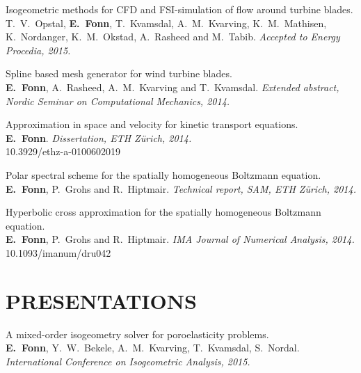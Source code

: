 \documentclass[line,margin]{res}
\newcommand{\zh}{Z\"{u}rich}
\begin{document}
\begin{resume}
Isogeometric methods for CFD and FSI-simulation of flow around turbine blades. \\
T.~V.~Opstal, {\bf E.~Fonn}, T.~Kvamsdal, A.~M.~Kvarving, K.~M.~Mathisen,
K.~Nordanger, K.~M.~Okstad, A.~Rasheed and M.~Tabib.
{\em Accepted to Energy Procedia, 2015.}




Spline based mesh generator for wind turbine blades. \\
{\bf E.~Fonn}, A.~Rasheed, A.~M.~Kvarving and T.~Kvamsdal.
{\em Extended abstract,  Nordic Seminar on Computational Mechanics, 2014.}

Approximation in space and velocity for kinetic transport equations. \\
{\bf E.~Fonn}.
{\em Dissertation, ETH \zh, 2014.} \\
10.3929/ethz-a-0100602019

Polar spectral scheme for the spatially homogeneous Boltzmann equation. \\
{\bf E.~Fonn}, P.~Grohs and R.~Hiptmair.
{\em Technical report, SAM, ETH \zh, 2014.}

Hyperbolic cross approximation for the spatially homogeneous Boltzmann equation. \\
{\bf E.~Fonn}, P.~Grohs and R.~Hiptmair.
{\em IMA Journal of Numerical Analysis, 2014.} \\
10.1093/imanum/dru042


\section{PRESENTATIONS}

A mixed-order isogeometry solver for poroelasticity problems. \\
{\bf E.~Fonn}, Y.~W.~Bekele, A.~M.~Kvarving, T.~Kvamsdal, S.~Nordal.
{\em {} International Conference on Isogeometric Analysis, 2015.}


\end{resume}
\end{document}
